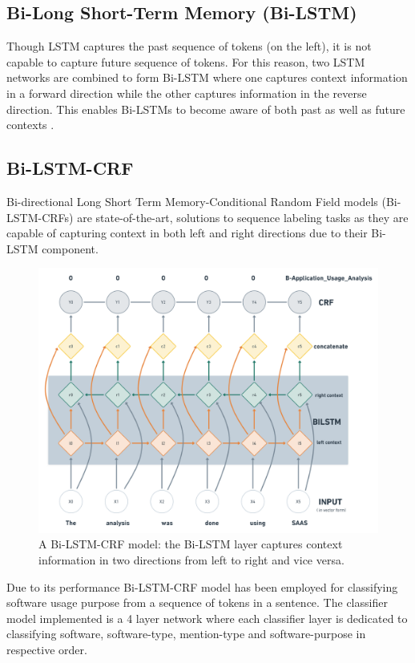 \subsection{Bi-Long Short-Term Memory (\ac{Bi-LSTM})}
\label{sec:chapter05:DLModels:BiLSTM}

Though \ac{LSTM} captures the past sequence of tokens (on the left), it is not capable to capture future sequence of tokens. For this reason, two LSTM networks are combined to form \ac{Bi-LSTM} where one captures context information in a forward direction while the other captures information in the reverse direction. This enables \ac{Bi-LSTM}s to become aware of both past as well as future contexts \citep{ma2016end}. 

\subsection{\ac{Bi-LSTM-CRF}}
\label{sec:chapter05:DLModels:BiLSTMCRF}

Bi-directional Long Short Term Memory-Conditional Random Field models (\ac{Bi-LSTM-CRF}s) are state-of-the-art, solutions to sequence labeling tasks as they are capable of capturing context in both left and right directions due to their \ac{Bi-LSTM} component. 

\begin{figure}[htbp]
	\centering
	\includegraphics[width=.60\textwidth]{4.graphics/figures/ch_5/Bi-LSTM-CRF}
	\caption{A \ac{Bi-LSTM-CRF} model: the \ac{Bi-LSTM} layer captures context information in two directions from left to right and vice versa. }
	\label{fig:chapter03:setup}
\end{figure}

Due to its performance \ac{Bi-LSTM-CRF} model has been employed for classifying software usage purpose from a sequence of tokens in a sentence. The classifier model implemented is a 4 layer network where each classifier layer is dedicated to classifying software, software-type, mention-type and software-purpose in respective order. \\

